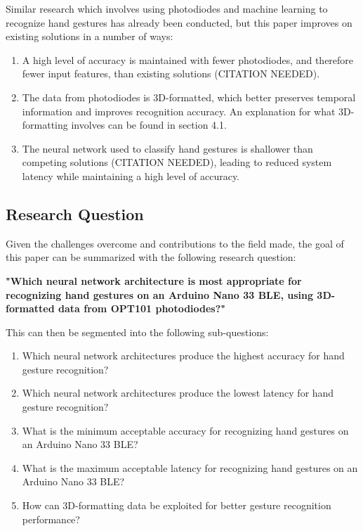 Similar research which involves using photodiodes and machine learning to recognize hand gestures has already been conducted, but this paper improves on existing solutions in a number of ways:
\begin{enumerate}
    \item A high level of accuracy is maintained with fewer photodiodes, and therefore fewer input features, than existing solutions (CITATION NEEDED).
    \item The data from photodiodes is 3D-formatted, which better preserves temporal information and improves recognition accuracy.
    An explanation for what 3D-formatting involves can be found in section 4.1\@.
    \item The neural network used to classify hand gestures is shallower than competing solutions (CITATION NEEDED), leading to reduced system latency while maintaining a high level of accuracy.
\end{enumerate}

\subsection{Research Question}\label{subsec:research-question}
Given the challenges overcome and contributions to the field made, the goal of this paper can be summarized with the following research question:

\textbf{"Which neural network architecture is most appropriate for recognizing hand gestures on an Arduino Nano 33 BLE, using 3D-formatted data from OPT101 photodiodes?"}

This can then be segmented into the following sub-questions:
\begin{enumerate}
    \item Which neural network architectures produce the highest accuracy for hand gesture recognition?
    \item Which neural network architectures produce the lowest latency for hand gesture recognition?
    \item What is the minimum acceptable accuracy for recognizing hand gestures on an Arduino Nano 33 BLE?
    \item What is the maximum acceptable latency for recognizing hand gestures on an Arduino Nano 33 BLE?
    \item How can 3D-formatting data be exploited for better gesture recognition performance?
\end{enumerate}

